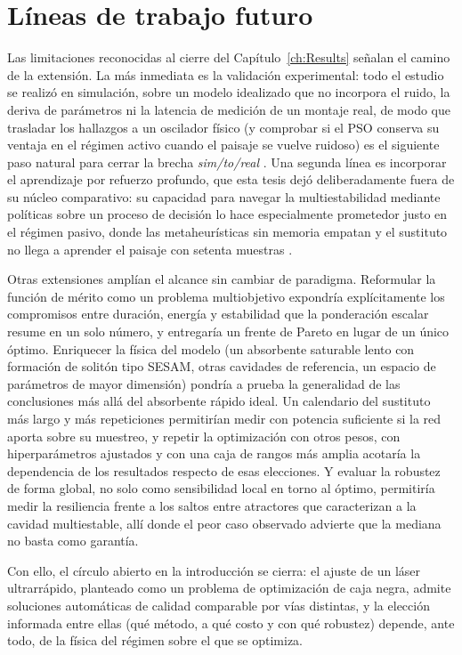\section{Líneas de trabajo futuro}
\label{sec:conc_futuro}

Las limitaciones reconocidas al cierre del Capítulo~\ref{ch:Results} señalan el camino de
la extensión. La más inmediata es la validación experimental: todo el estudio se realizó en
simulación, sobre un modelo idealizado que no incorpora el ruido, la deriva de parámetros ni
la latencia de medición de un montaje real, de modo que trasladar los hallazgos a un
oscilador físico (y comprobar si el PSO conserva su ventaja en el régimen activo cuando el
paisaje se vuelve ruidoso) es el siguiente paso natural para cerrar la brecha \emph{sim\-/to\-/real}
\cite{Zhao2020}. Una segunda línea es incorporar el aprendizaje por refuerzo profundo, que
esta tesis dejó deliberadamente fuera de su núcleo comparativo: su capacidad para navegar la
multiestabilidad mediante políticas sobre un proceso de decisión lo hace especialmente
prometedor justo en el régimen pasivo, donde las metaheurísticas sin memoria empatan y el
sustituto no llega a aprender el paisaje con setenta muestras \cite{Kokhanovskiy2024}.

Otras extensiones amplían el alcance sin cambiar de paradigma. Reformular la función de
mérito como un problema multiobjetivo expondría explícitamente los compromisos entre
duración, energía y estabilidad que la ponderación escalar resume en un solo número, y
entregaría un frente de Pareto en lugar de un único óptimo. Enriquecer la física del modelo
(un absorbente saturable lento con formación de solitón tipo SESAM, otras cavidades de
referencia, un espacio de parámetros de mayor dimensión) pondría a prueba la generalidad de
las conclusiones más allá del absorbente rápido ideal. Un calendario del sustituto más largo y más repeticiones permitirían medir con potencia
suficiente si la red aporta sobre su muestreo, y repetir la optimización con otros pesos,
con hiperparámetros ajustados y con una caja de rangos más amplia acotaría la
dependencia de los resultados respecto de esas elecciones. Y evaluar la robustez de forma global,
no solo como sensibilidad local en torno al óptimo, permitiría medir la resiliencia frente a
los saltos entre atractores que caracterizan a la cavidad multiestable, allí donde el peor
caso observado advierte que la mediana no basta como garantía.

Con ello, el círculo abierto en la introducción se cierra: el ajuste de un láser ultrarrápido,
planteado como un problema de optimización de caja negra, admite soluciones automáticas de
calidad comparable por vías distintas, y la elección informada entre ellas (qué método, a qué
costo y con qué robustez) depende, ante todo, de la física del régimen sobre el que se
optimiza.
